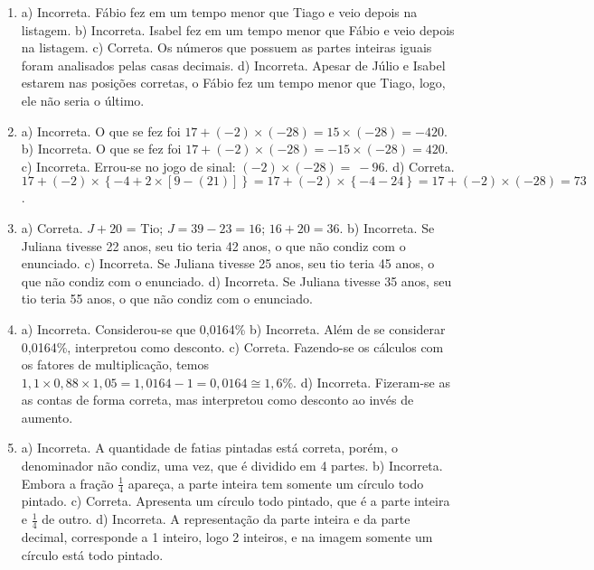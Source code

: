 \begin{enumerate}
\item a) Incorreta. Fábio fez em um tempo menor que Tiago e veio depois na listagem.
b) Incorreta. Isabel fez em um tempo menor que Fábio e veio depois na listagem.
c) Correta. Os números que possuem as partes inteiras iguais foram analisados pelas casas decimais.
d) Incorreta. Apesar de Júlio e Isabel estarem nas posições corretas, o Fábio fez um tempo menor que Tiago, logo, ele não seria o último.

\item a) Incorreta. O que se fez foi
$17 + ( - 2) \times \left( - 28 \right) = 15 \times ( - 28) = - 420$.
b) Incorreta. O que se fez foi
$17 + ( - 2) \times \left( - 28 \right) = - 15 \times ( - 28) = 420$. 
c) Incorreta. Errou-se no jogo de sinal:
$( - 2) \times \left( - 28 \right) = \  - 96$.
d) Correta. 
$17 + ( - 2) \times \left\{ - 4 + 2 \times \left\lbrack 9 - \left( 21 \right) \right\rbrack \right\} = 17 + ( - 2) \times \left\{ - 4 - 24 \right\} = 17 + ( - 2) \times \left( - 28 \right) = 73$.


\item a) Correta. $J + 20$ = Tio; $J = 39 - 23 = 16$; $16 + 20 = 36$.
b) Incorreta. Se Juliana tivesse 22 anos, seu tio teria 42 anos, o que não condiz com o enunciado.
c) Incorreta. Se Juliana tivesse 25 anos, seu tio teria 45 anos, o que não condiz com o enunciado.
d) Incorreta. Se Juliana tivesse 35 anos, seu tio teria 55 anos, o que não condiz com o enunciado.


\item a) Incorreta. Considerou-se que 0,0164\%
b) Incorreta. Além de se considerar 0,0164\%,
interpretou como desconto.
c) Correta. Fazendo-se os cálculos com os fatores de multiplicação,
temos $1,1 \times 0,88 \times 1,05 = 1,0164 - 1 = 0,0164\cong 1,6\%$.
d) Incorreta. Fizeram-se as as contas de forma correta, mas interpretou como desconto ao invés de aumento.

\item a) Incorreta. A quantidade de fatias pintadas está correta, porém, o denominador não condiz, uma vez, que é dividido em 4 partes.
b) Incorreta. Embora a fração $\frac{1}{4}$ apareça, a parte inteira tem somente um círculo todo pintado.
c) Correta. Apresenta um círculo todo pintado, que é a parte inteira e $\frac{1}{4}$ de outro.
d) Incorreta. A representação da parte inteira e da parte decimal, corresponde a 1 inteiro, logo 2 inteiros, e na imagem somente um círculo está todo pintado.



\end{enumerate}

